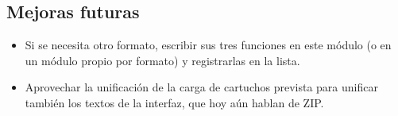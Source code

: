 \subsection{Mejoras futuras}
\label{sec:F5I11Futuro}

\begin{itemize}
	\item Si se necesita otro formato, escribir sus tres funciones en este módulo (o en un módulo propio por formato) y registrarlas en la lista.
	\item Aprovechar la unificación de la carga de cartuchos prevista para unificar también los textos de la interfaz, que hoy aún hablan de ZIP.
\end{itemize}